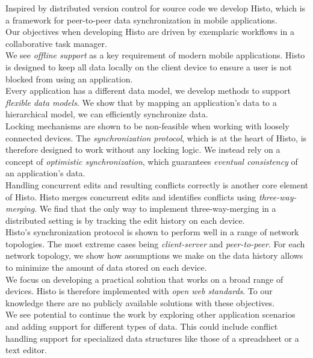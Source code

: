 

Inspired by distributed version control for source code we develop Histo, which is a framework for peer-to-peer data synchronization in mobile applications.\\
Our objectives when developing Histo are driven by exemplaric workflows in a collaborative task manager.\\
We see \emph{offline support} as a key requirement of modern mobile applications.
Histo is designed to keep all data locally on the client device to ensure a user is not blocked from using an application.\\
Every application has a different data model, we develop methods to support \emph{flexible data models}.
We show that by mapping an application's data to a hierarchical model, we can efficiently synchronize data.\\
Locking mechanisms are shown to be non-feasible when working with loosely connected devices.
The \emph{synchronization protocol}, which is at the heart of Histo, is therefore designed to work without any locking logic.
We instead rely on a concept of \emph{optimistic synchronization}, which guarantees \emph{eventual consistency} of an application's data.\\
Handling concurrent edits and resulting conflicts correctly is another core element of Histo.
Histo merges concurrent edits and identifies conflicts using \emph{three-way-merging}.
We find that the only way to implement three-way-merging in a distributed setting is by tracking the edit history on each device.\\
Histo's synchronization protocol is shown to perform well in a range of network topologies.
The most extreme cases being \emph{client-server} and \emph{peer-to-peer}.
For each network topology, we show how assumptions we make on the data history allows to minimize the amount of data stored on each device.\\
We focus on developing a practical solution that works on a broad range of devices.
Histo is therefore implemented with \emph{open web standards}.
To our knowledge there are no publicly available solutions with these objectives.\\
We see potential to continue the work by exploring other application scenarios and adding support for different types of data.
This could include conflict handling support for specialized data structures like those of a spreadsheet or a text editor.